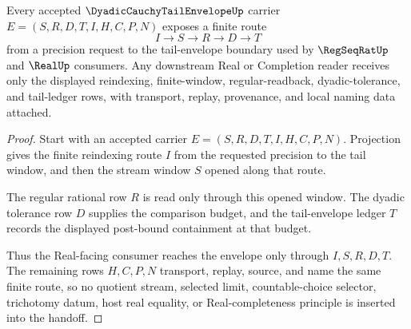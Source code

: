 
\begin{theorem}
\label{thm:dyadic-cauchy-tail-envelope-regseqrat-real-route}
Every accepted $\DyadicCauchyTailEnvelopeUp$ carrier $E=(S,R,D,T,I,H,C,P,N)$ exposes a finite route
$$
I \longrightarrow S \longrightarrow R \longrightarrow D \longrightarrow T
$$
from a precision request to the tail-envelope boundary used by $\RegSeqRatUp$ and $\RealUp$ consumers. Any downstream Real or Completion reader receives only the displayed reindexing, finite-window, regular-readback, dyadic-tolerance, and tail-ledger rows, with transport, replay, provenance, and local naming data attached.
\end{theorem}
\begin{proof}
Start with an accepted carrier $E=(S,R,D,T,I,H,C,P,N)$. Projection gives the finite reindexing route $I$ from the requested precision to the tail window, and then the stream window $S$ opened along that route.

The regular rational row $R$ is read only through this opened window. The dyadic tolerance row $D$ supplies the comparison budget, and the tail-envelope ledger $T$ records the displayed post-bound containment at that budget.

Thus the Real-facing consumer reaches the envelope only through $I,S,R,D,T$. The remaining rows $H,C,P,N$ transport, replay, source, and name the same finite route, so no quotient stream, selected limit, countable-choice selector, trichotomy datum, host real equality, or Real-completeness principle is inserted into the handoff.
\end{proof}

